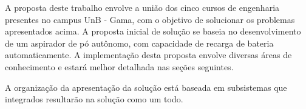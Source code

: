 
A proposta deste trabalho envolve a união dos cinco cursos de engenharia presentes no campus UnB - Gama, com o objetivo de solucionar os problemas apresentados acima. A proposta inicial de solução se baseia no desenvolvimento de um aspirador de pó autônomo, com capacidade de recarga de bateria automaticamente. A implementação desta proposta envolve diversas áreas de conhecimento e estará melhor detalhada nas seções seguintes.

A organização da apresentação da solução está baseada em subsistemas que integrados resultarão na solução como um todo. 


















